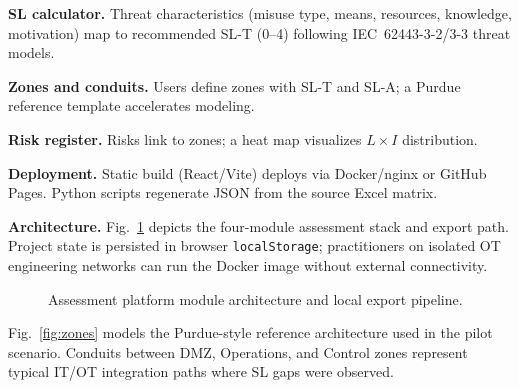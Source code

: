 \documentclass[10pt,conference]{IEEEtran}
\begin{document}
\textbf{SL calculator.} Threat characteristics (misuse type, means, resources, knowledge, motivation) map to recommended SL-T (0--4) following IEC~62443-3-2/3-3 threat models.

\textbf{Zones and conduits.} Users define zones with SL-T and SL-A; a Purdue reference template accelerates modeling.

\textbf{Risk register.} Risks link to zones; a heat map visualizes $L \times I$ distribution.

\textbf{Deployment.} Static build (React/Vite) deploys via Docker/nginx or GitHub Pages. Python scripts regenerate JSON from the source Excel matrix.

\textbf{Architecture.} Fig.~\ref{fig:architecture} depicts the four-module assessment stack and export path. Project state is persisted in browser \texttt{localStorage}; practitioners on isolated OT engineering networks can run the Docker image without external connectivity.

\begin{figure}[!t]
\centering
{}
\caption{Assessment platform module architecture and local export pipeline.}
\label{fig:architecture}
\end{figure}

Fig.~\ref{fig:zones} models the Purdue-style reference architecture used in the pilot scenario. Conduits between DMZ, Operations, and Control zones represent typical IT/OT integration paths where SL gaps were observed.
\end{document}
